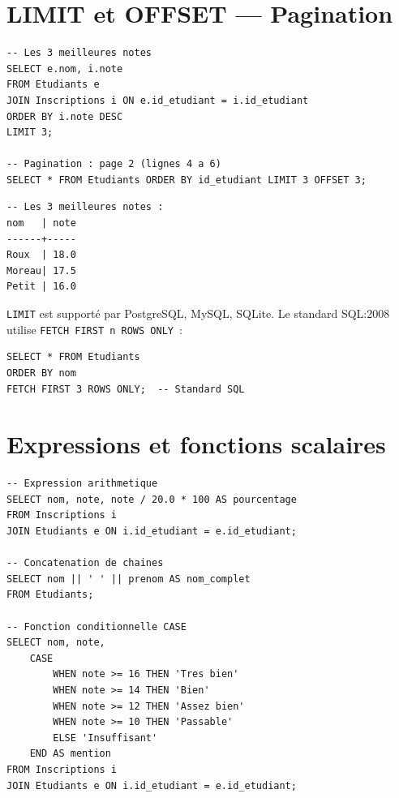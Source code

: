 \section{LIMIT et OFFSET --- Pagination}

\begin{codeblock}[title=\textbf{Limiter les r\'esultats}]
\begin{verbatim}
-- Les 3 meilleures notes
SELECT e.nom, i.note
FROM Etudiants e
JOIN Inscriptions i ON e.id_etudiant = i.id_etudiant
ORDER BY i.note DESC
LIMIT 3;

-- Pagination : page 2 (lignes 4 a 6)
SELECT * FROM Etudiants ORDER BY id_etudiant LIMIT 3 OFFSET 3;
\end{verbatim}
\end{codeblock}

\begin{codeoutput}
\begin{verbatim}
-- Les 3 meilleures notes :
nom   | note
------+-----
Roux  | 18.0
Moreau| 17.5
Petit | 16.0
\end{verbatim}
\end{codeoutput}

\begin{attention}[title=\textbf{LIMIT n'est pas standard SQL}]
\texttt{LIMIT} est support\'e par PostgreSQL, MySQL, SQLite.
Le standard SQL:2008 utilise \texttt{FETCH FIRST n ROWS ONLY}~:
\begin{verbatim}
SELECT * FROM Etudiants
ORDER BY nom
FETCH FIRST 3 ROWS ONLY;  -- Standard SQL
\end{verbatim}
\end{attention}

\section{Expressions et fonctions scalaires}

\begin{codeblock}[title=\textbf{Expressions calcul\'ees}]
\begin{verbatim}
-- Expression arithmetique
SELECT nom, note, note / 20.0 * 100 AS pourcentage
FROM Inscriptions i
JOIN Etudiants e ON i.id_etudiant = e.id_etudiant;

-- Concatenation de chaines
SELECT nom || ' ' || prenom AS nom_complet
FROM Etudiants;

-- Fonction conditionnelle CASE
SELECT nom, note,
    CASE
        WHEN note >= 16 THEN 'Tres bien'
        WHEN note >= 14 THEN 'Bien'
        WHEN note >= 12 THEN 'Assez bien'
        WHEN note >= 10 THEN 'Passable'
        ELSE 'Insuffisant'
    END AS mention
FROM Inscriptions i
JOIN Etudiants e ON i.id_etudiant = e.id_etudiant;
\end{verbatim}
\end{codeblock}

